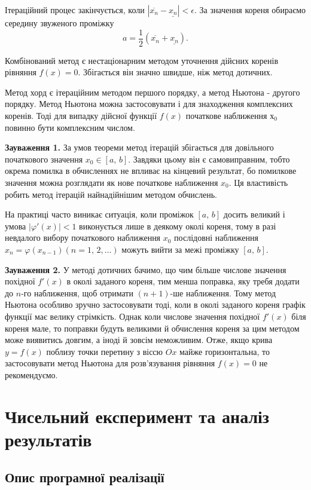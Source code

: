 \documentclass[14pt,a4paper,titlepage]{extarticle}
\begin{document}
Ітераційний процес закінчується, коли $\left| \overline{x_n} - \underline{x_n} \right| < \epsilon$. За значення кореня обираємо середину звуженого проміжку
$$
a = \frac{1}{2}(\overline{x_n} + \underline{x_n}).
$$

Комбінований метод є нестаціонарним методом уточнення дійсних коренів рівняння $f(x) = 0$. Збігається він значно швидше, ніж метод дотичних.

Метод хорд є ітераційним методом першого порядку, а метод Ньютона - другого порядку. Метод Ньютона можна застосовувати і для знаходження комплексних коренів. Тоді для випадку дійсної функції $f(x)$ початкове наближення $х_0$ повинно бути комплексним числом. 

\textbf{Зауваження 1.} За умов теореми метод ітерацій збігається для довільного початкового значення $x_0 \in [a,\,b]$. Завдяки цьому він є самовиправним, тобто окрема помилка в обчисленнях не впливає на кінцевий результат, бо помилкове значення можна розглядати як нове початкове наближення $x_0$. Ця властивість робить метод ітерацій найнадійнішим методом обчислень.

На практиці часто виникає ситуація, коли проміжок $[a,\,b]$ досить великий і умова $|\varphi'(x)| < 1$ виконується лише в деякому околі кореня, тому в разі невдалого вибору початкового наближення $x_0$ послідовні наближення $x_n = \varphi(x_{n-1})(n = 1,\,2,\ldots)$ можуть вийти за межі проміжку $[a,\,b]$.

\textbf{Зауваження 2.} У методі дотичних бачимо, що чим більше числове значення похідної $f'(x)$ в околі заданого кореня, тим менша поправка, яку требя додати до $n$-го наближення, щоб отримати $(n+1)$-ше наближення. Тому метод Ньютона особливо зручно застосовувати тоді, коли в околі заданого кореня графік функції має велику стрімкість. Однак коли числове значення похідної $f'(x)$ біля кореня мале, то поправки будуть великими й обчислення кореня за цим методом може виявитись довгим, а іноді й зовсім неможливим. Отже, якщо крива $y = f(x)$ поблизу точки перетину з віссю $Ox$ майже горизонтальна, то застосовувати метод Ньютона для розв'язування рівняння $f(x) = 0$ не рекомендуємо.
\newpage
{\centering \section{Чисельний експеримент та аналіз результатів}}
{\centering \subsection{Опис програмної реалізації}}
\end{document}
